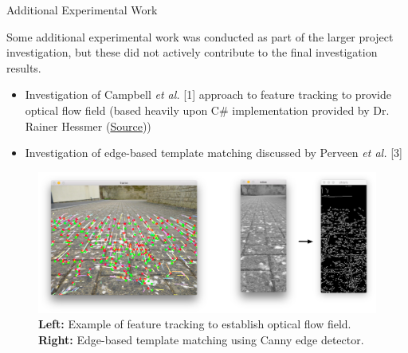 \documentclass[10pt, compress]{beamer}
\begin{document}
\begin{frame}{Additional Experimental Work}

\vspace{-10pt}

{\small Some additional experimental work was conducted as part of the larger project investigation, but these did not actively contribute to the final investigation results.

\begin{itemize}[label={\textbullet}]
  	\item Investigation of Campbell \textit{et al.} [1] approach to feature tracking to provide optical flow field (based heavily upon C\# implementation provided by Dr. Rainer Hessmer (\href{http://www.hessmer.org/blog/2010/08/17/monocular-visual-odometry}{Source}))
  	\item Investigation of edge-based template matching discussed by Perveen \textit{et al.} [3]
  \end{itemize} }
  
  \vspace{-10pt}
  
    		  \begin{figure}[ht!]
\centering
\includegraphics[scale=0.13]{additional_work}
 \caption{\textbf{Left:} Example of feature tracking to establish optical flow field. \textbf{Right:} Edge-based template matching using Canny edge detector.}
\end{figure}
  		

\end{frame}

\end{document}
